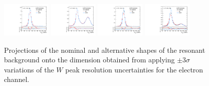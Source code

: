 \begin{figure}[htbp]
  \centering
  \includegraphics[width=0.21\textwidth]{fig/analysisAppendix/systs_res_e_HP_nobb_LDy_resWY_ProjY.pdf}
  \includegraphics[width=0.21\textwidth]{fig/analysisAppendix/systs_res_e_LP_nobb_LDy_resWY_ProjY.pdf}
  \includegraphics[width=0.21\textwidth]{fig/analysisAppendix/systs_res_e_HP_nobb_HDy_resWY_ProjY.pdf}
  \includegraphics[width=0.21\textwidth]{fig/analysisAppendix/systs_res_e_LP_nobb_HDy_resWY_ProjY.pdf}\\
  \caption{
    Projections of the nominal and alternative shapes of the resonant background onto the \MJ dimension obtained from applying $\pm3\sigma$ variations of the $W$ peak resolution uncertainties for the electron channel.
  }
  \label{fig:systResMJ_resWY}
\end{figure}

